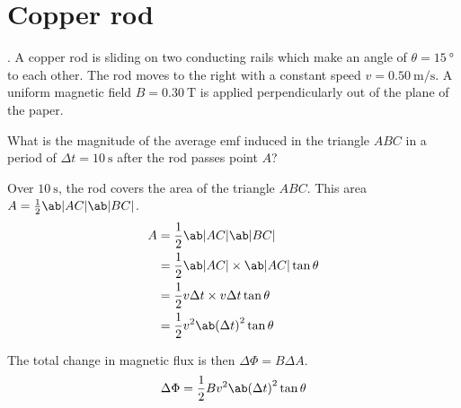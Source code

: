 \section{Copper rod}
\begin{marginfigure}
	\caption{Sliding copper rod}
	\label{fig:sliding-rod}
\end{marginfigure}
\begin{problem}
. A copper rod is sliding on two conducting rails which make an angle of \(\theta = \qty{15}{\degree}\)
to each other. The rod moves to the right with a constant speed \(v = \qty{0.50}{\metre\per\second}\).
A uniform magnetic field \(B = \qty{0.30}{\tesla}\) is applied perpendicularly out of the plane
of the paper.

What is the magnitude of the average emf induced in the triangle \(ABC\) in a period of
\(\Delta t = \qty{10}{\second}\) after the rod passes point \(A\)?
\label{prob:2i}
\end{problem}

Over \(\qty{10}{\second}\), the rod covers the area of the triangle \(ABC\).
This area \(A = \f{1}{2}\ab|AC|\ab|BC|\).
\begin{align*}
	A & = \f{1}{2}\ab|AC|\ab|BC|                      \\
	  & = \f{1}{2}\ab|AC|\times\ab|AC|\tan\theta      \\
	  & = \f{1}{2}v\Delta t\times v\Delta t\tan\theta \\
	  & = \f{1}{2}v^2{\ab(\Delta t)}^2\tan\theta
\end{align*}

The total change in magnetic flux is then \(\Delta\Phi = B\Delta A\).
\begin{equation*}
	\Delta\Phi = \f{1}{2}Bv^2{\ab(\Delta t)}^2\tan\theta
\end{equation*}

